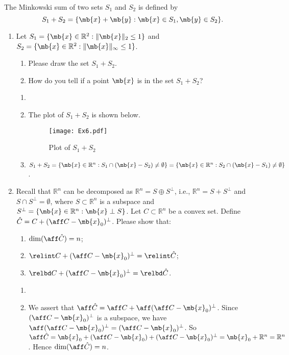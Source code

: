 \begin{exercise}
  The Minkowski sum of two sets $S_1$ and $S_2$ is defined by
  $$
    S_1+S_2=\{\mb{x}+\mb{y}:\mb{x}\in S_1,\mb{y}\in S_2\}.
  $$
  \begin{enumerate}
    \item
      Let $S_1=\{\mb{x}\in\mathbb{R}^2:\|\mb{x}\|_2\le1\}$ and $S_2=\{\mb{x}\in\mathbb{R}^2:\|\mb{x}\|_\infty\le 1\}$.
      \begin{enumerate}
        \item
          Please draw the set $S_1+S_2$.
        \item
          How do you tell if a point $\mb{x}$ is in the set $S_1+S_2$?
      \end{enumerate}
      \begin{solution}
        \begin{enumerate}
          \item []
          \item The plot of $S_1+S_2$ is shown below.
            \begin{figure}[H]
              \centering
              \texttt{[image: Ex6.pdf]}
              \caption{Plot of $S_1+S_2$}
            \end{figure}
          \item $S_1 + S_2 = \{\mb{x}\in \mathbb{R}^n : S_1 \cap (\mb{x}-S_2) \neq \emptyset\} = \{\mb{x}\in \mathbb{R}^n : S_2 \cap (\mb{x}-S_1) \neq \emptyset\}$.
            \qedhere
        \end{enumerate}
      \end{solution}
    \item
      Recall that $\mathbb{R}^n$ can be decomposed as $\mathbb{R}^n=S\oplus S^\perp$, i.e., $\mathbb{R}^n = S+S^\perp$ and $S\cap S^\perp=\emptyset$, where $S\subset\mathbb{R}^n$ is a subspace and $S^\perp = \{\mb{x}\in\mathbb{R}^n: \mb{x}\perp S\}$. Let $C\subset\mathbb{R}^n$ be a convex set. Define $\hat{C}=C+(\aff C-\mb{x}_0)^\perp$. Please show that:
      \begin{enumerate}
        \item
          $\dim (\aff \hat{C})=n$;
        \item
          $\relint C + (\aff C-\mb{x}_0)^\perp = \relint \hat{C}$;
        \item
          $\relbd C + (\aff C-\mb{x}_0)^\perp = \relbd\hat{C}$.
      \end{enumerate}
      \begin{solution}
        \begin{enumerate}
          \item []
          \item 
            We assert that $\aff \hat{C} = \aff C + \aff (\aff C-\mb{x}_0)^\perp$. Since $(\aff C-\mb{x}_0)^\perp$ is a subspace, we have $\aff (\aff C-\mb{x}_0)^\perp = (\aff C-\mb{x}_0)^\perp$. So $\aff \hat{C} = \mb{x}_0 + (\aff C-\mb{x}_0) + (\aff C-\mb{x}_0)^\perp= \mb{x}_0 + \mathbb{R}^n = \mathbb{R}^n$. Hence $\dim (\aff \hat{C}) = n$. 


\end{enumerate}
\end{solution}
\end{enumerate}
\end{exercise}
